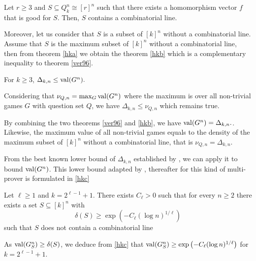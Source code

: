 \begin{pro}	Let $r \geq 3$ and $S \subseteq Q_k^n \cong [r]^n$ such that there exists a homomorphism vector $f$ that is good for $S$. Then, $S$ contains a combinatorial line.	\label{prop}\end{pro}
 
Moreover, let us consider that $S$ is a subset of $[k]^n$ without a combinatorial line. Assume that $S$ is the maximum subset of $[k]^n$ without a combinatorial line, then from theorem \eqref{hka} we obtain the theorem \eqref{hkb} which is a  complementary inequality to theorem \eqref{ver96}.
 
 \begin{thm} For $k \geq 3$, $\Delta_{k,n}	\leq \mathrm{val} (G^n).$ \label{hkb}	\end{thm}
 
 Considering that $\nu_{Q,n}=\max_G \mathrm{val} (G^n)$ where the maximum is over all non-trivial games $G$ with question set $Q$, we have $\Delta_{k,n}	\leq \nu_{Q,n}$ which remains true.
 
 By combining the two theorems \eqref{ver96} and \eqref{hkb}, we have $\mathrm{val} (G^n)=\Delta_{k,n}.$. Likewise, the maximum  value of  all non-trivial games equals to the density of the maximum subset of $[k]^n$ without a combinatorial line, that is $\nu_{Q,n}=\Delta_{k,n}.$
 
From the best known lower bound of $\Delta_{k,n}$ established by \cite{polymath2010density}, we can apply it to bound $\mathrm{val} (G^n)$. This lower bound adapted by \cite{hkazla2016forbidden}, thereafter for this kind of multi-prover is formulated in \eqref{hkc}
 
 \begin{thm}Let $\ell \geq 1$ and $k=2^{\ell-1}+1.$ There exists $C_{\ell} >0$ such that for every $n\geq 2$ there exists a set $S \subseteq [k]^n$ with $$ \delta(S) \geq \exp \left( -C_{\ell} (\log n)^{1/\ell} \right)$$	 such that $S$ does not contain a combinatorial line  \label{hkc}	\end{thm}

 As $\mathrm{val} (G_S^n) \geq  \delta(S)$, we deduce from \eqref{hkc} that  $\mathrm{val} (G_S^n) \geq  \exp \left( -C_{\ell} (\log n)^{1/\ell} \right)$ for $k=2^{\ell-1}+1.$

 
 
 
 




















